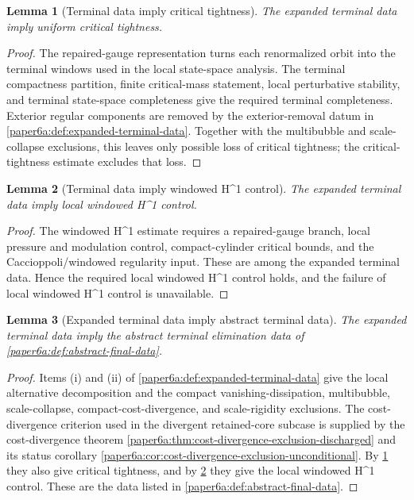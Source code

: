 \documentclass[11pt]{amsart}
\def\({}%
\def\){}%
\theoremstyle{plain}
\newtheorem{lemma}[lemma]{Lemma}
\theoremstyle{definition}
\theoremstyle{remark}
\begin{document}
\begin{lemma}[Terminal data imply critical tightness]
\label{paper6a:lem:terminal-critical-tightness}
The expanded terminal data imply uniform critical tightness.
\end{lemma}

\begin{proof}
The repaired-gauge representation turns each renormalized orbit into the
terminal windows used in the local state-space analysis.  The terminal
compactness partition, finite critical-mass statement, local perturbative
stability, and terminal state-space completeness give the required terminal
completeness.  Exterior regular components are removed by the exterior-removal
datum in \cref{paper6a:def:expanded-terminal-data}.
Together with the multibubble and scale-collapse exclusions, this leaves only
possible loss of critical tightness; the critical-tightness estimate excludes
that loss.
\end{proof}

\begin{lemma}[Terminal data imply windowed \(H^1\) control]
\label{paper6a:lem:terminal-windowed-h1}
The expanded terminal data imply local windowed \(H^1\) control.
\end{lemma}

\begin{proof}
The windowed \(H^1\) estimate requires a repaired-gauge branch, local pressure and
modulation control, compact-cylinder critical bounds, and the
Caccioppoli/windowed regularity input.  These are among the expanded terminal
data.  Hence the required local windowed \(H^1\) control holds, and the
failure of local windowed \(H^1\) control is unavailable.
\end{proof}

\begin{lemma}[Expanded terminal data imply abstract terminal data]
\label{paper6a:lem:expanded-to-abstract}
The expanded terminal data imply the abstract terminal elimination data of
\cref{paper6a:def:abstract-final-data}.
\end{lemma}

\begin{proof}
Items \textup{(i)} and \textup{(ii)} of
\cref{paper6a:def:expanded-terminal-data} give the local alternative
decomposition and the compact vanishing-dissipation, multibubble,
scale-collapse, compact-cost-divergence, and scale-rigidity exclusions.  The
cost-divergence criterion used in the divergent retained-core subcase is
supplied by the cost-divergence theorem
\cref{paper6a:thm:cost-divergence-exclusion-discharged} and its status
corollary \cref{paper6a:cor:cost-divergence-exclusion-unconditional}.  By
\cref{paper6a:lem:terminal-critical-tightness} they also give critical
tightness, and by
\cref{paper6a:lem:terminal-windowed-h1} they give the local windowed \(H^1\)
control.  These are the data listed in
\cref{paper6a:def:abstract-final-data}.
\end{proof}
\end{document}
